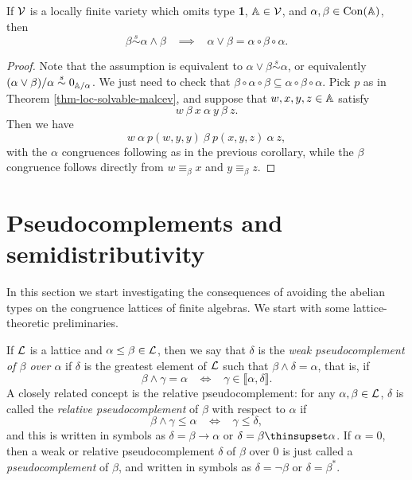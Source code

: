 \begin{appendices}
\begin{cor} If $\mathcal{V}$ is a locally finite variety which omits type \textbf{1}, $\mathbb{A} \in \mathcal{V}$, and $\alpha, \beta \in \operatorname{Con}(\mathbb{A})$, then
\[
\beta \stackrel{s}{\sim} \alpha \wedge \beta \;\;\; \implies \;\;\; \alpha \vee \beta = \alpha \circ \beta \circ \alpha.
\]
\end{cor}
\begin{proof} Note that the assumption is equivalent to $\alpha \vee \beta \stackrel{s}{\sim} \alpha$, or equivalently $(\alpha \vee \beta)/\alpha \stackrel{s}{\sim} 0_{\mathbb{A}/\alpha}$. We just need to check that $\beta \circ \alpha \circ \beta \subseteq \alpha \circ \beta \circ \alpha$. Pick $p$ as in Theorem \ref{thm-loc-solvable-malcev}, and suppose that $w,x,y,z \in \mathbb{A}$ satisfy
\[
w\ \beta\ x\ \alpha\ y\ \beta\ z.
\]
Then we have
\[
w\ \alpha\ p(w,y,y)\ \beta\ p(x,y,z)\ \alpha\ z,
\]
with the $\alpha$ congruences following as in the previous corollary, while the $\beta$ congruence follows directly from $w \equiv_\beta x$ and $y \equiv_\beta z$.
\end{proof}


\section{Pseudocomplements and semidistributivity}

In this section we start investigating the consequences of avoiding the abelian types on the congruence lattices of finite algebras. We start with some lattice-theoretic preliminaries.

\begin{defn} If $\mathcal{L}$ is a lattice and $\alpha \le \beta \in \mathcal{L}$, then we say that $\delta$ is the \emph{weak pseudocomplement of $\beta$ over $\alpha$} if $\delta$ is the greatest element of $\mathcal{L}$ such that $\beta \wedge \delta = \alpha$, that is, if
\[
\beta \wedge \gamma = \alpha \;\;\; \iff \;\;\; \gamma \in \llbracket \alpha, \delta \rrbracket.
\]
A closely related concept is the relative pseudocomplement: for any $\alpha, \beta \in \mathcal{L}$, $\delta$ is called the \emph{relative pseudocomplement} of $\beta$ with respect to $\alpha$ if
\[
\beta \wedge \gamma \le \alpha \;\;\; \iff \;\;\; \gamma \le \delta,
\]
and this is written in symbols as $\delta = \beta \to \alpha$ or $\delta = \beta \thinsupset \alpha$. If $\alpha = 0$, then a weak or relative pseudocomplement $\delta$ of $\beta$ over $0$ is just called a \emph{pseudocomplement} of $\beta$, and written in symbols as $\delta = \neg \beta$ or $\delta = \beta^*$.


\end{defn}
\end{appendices}

